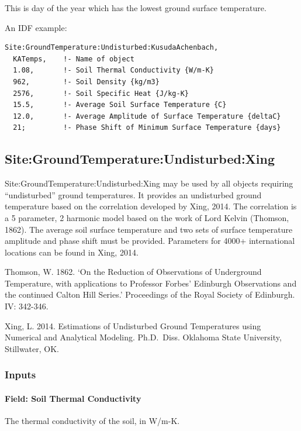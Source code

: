 This is day of the year which has the lowest ground surface temperature.

An IDF example:

\begin{lstlisting}
Site:GroundTemperature:Undisturbed:KusudaAchenbach,
  KATemps,    !- Name of object
  1.08,       !- Soil Thermal Conductivity {W/m-K}
  962,        !- Soil Density {kg/m3}
  2576,       !- Soil Specific Heat {J/kg-K}
  15.5,       !- Average Soil Surface Temperature {C}
  12.0,       !- Average Amplitude of Surface Temperature {deltaC}
  21;         !- Phase Shift of Minimum Surface Temperature {days}
\end{lstlisting}

\subsection{Site:GroundTemperature:Undisturbed:Xing}\label{sitegroundtemperatureundisturbedxing}

Site:GroundTemperature:Undisturbed:Xing may be used by all objects requiring ``undisturbed'' ground temperatures. It provides an undisturbed ground temperature based on the correlation developed by Xing, 2014. The correlation is a 5 parameter, 2 harmonic model based on the work of Lord Kelvin (Thomson, 1862). The average soil surface temperature and two sets of surface temperature amplitude and phase shift must be provided. Parameters for 4000+ international locations can be found in Xing, 2014.

Thomson, W. 1862. `On the Reduction of Observations of Underground Temperature, with applications to Professor Forbes' Edinburgh Observations and the continued Calton Hill Series.' Proceedings of the Royal Society of Edinburgh. IV: 342-346.

Xing, L. 2014. Estimations of Undisturbed Ground Temperatures using Numerical and Analytical Modeling. Ph.D.~Diss. Oklahoma State University, Stillwater, OK.

\subsubsection{Inputs}\label{inputs-15-007}

\paragraph{Field: Soil Thermal Conductivity}\label{field-soil-thermal-conductivity-2}

The thermal conductivity of the soil, in W/m-K.


